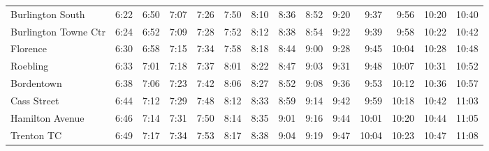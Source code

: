 \begin{center}
\begin{tabular}{@{}lrrrrrrrrrrrrr@{}}
Burlington South & 6:22 & 6:50 & 7:07 & 7:26 & 7:50 & 8:10 & 8:36 & 8:52 & 9:20 & 9:37 & 9:56 & 10:20 & 10:40 \\
Burlington Towne Ctr & 6:24 & 6:52 & 7:09 & 7:28 & 7:52 & 8:12 & 8:38 & 8:54 & 9:22 & 9:39 & 9:58 & 10:22 & 10:42 \\
Florence & 6:30 & 6:58 & 7:15 & 7:34 & 7:58 & 8:18 & 8:44 & 9:00 & 9:28 & 9:45 & 10:04 & 10:28 & 10:48 \\
Roebling & 6:33 & 7:01 & 7:18 & 7:37 & 8:01 & 8:22 & 8:47 & 9:03 & 9:31 & 9:48 & 10:07 & 10:31 & 10:52 \\
Bordentown & 6:38 & 7:06 & 7:23 & 7:42 & 8:06 & 8:27 & 8:52 & 9:08 & 9:36 & 9:53 & 10:12 & 10:36 & 10:57 \\
Cass Street & 6:44 & 7:12 & 7:29 & 7:48 & 8:12 & 8:33 & 8:59 & 9:14 & 9:42 & 9:59 & 10:18 & 10:42 & 11:03 \\
Hamilton Avenue & 6:46 & 7:14 & 7:31 & 7:50 & 8:14 & 8:35 & 9:01 & 9:16 & 9:44 & 10:01 & 10:20 & 10:44 & 11:05 \\
Trenton TC & 6:49 & 7:17 & 7:34 & 7:53 & 8:17 & 8:38 & 9:04 & 9:19 & 9:47 & 10:04 & 10:23 & 10:47 & 11:08 \\
\bottomrule\end{tabular}\end{center}
